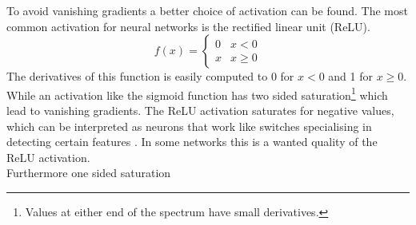 			
			To avoid vanishing gradients a better choice of activation can be found. The most common activation for neural networks is the rectified linear unit (ReLU).
			\begin{equation}
				f(x) = 	\begin{cases}
							0 & x < 0\\
							x & x \geq 0
						\end{cases}
				\label{EQ:ReLU}
			\end{equation}
			The derivatives of this function is easily computed to 0 for $ x < 0$ and 1 for $ x \geq 0$. While an activation like the sigmoid function has two sided saturation\footnote{Values at either end of the spectrum have small derivatives.} which lead to vanishing gradients. The ReLU activation saturates for negative values, which can be interpreted as neurons that work like switches specialising in detecting certain features . In some networks this is a wanted quality of the ReLU activation.\\
			Furthermore one sided saturation 
			
